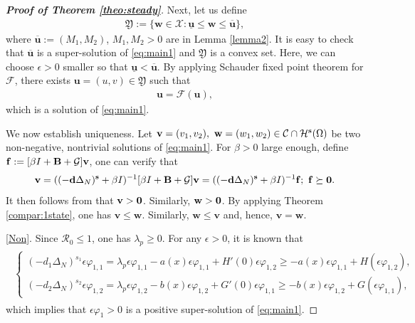\documentclass[a4paper,11pt]{amsart}
\theoremstyle{definition}
\def\O{\Omega}
\numberwithin{equation}{section}
\theoremstyle{definition}
\def\O{\Omega}
\begin{document}
\begin{proof}[\bf Proof of Theorem \ref{theo:steady}]
Next, let us define
\begin{align*}
\mathfrak{Y}:=\{\textbf{w}\in\mathcal{X}: \underline{\textbf{u}}\leq\textbf{w} \leq \overline{\textbf{u}} \},
\end{align*}
where $\overline{\textbf{u}} :=(M_1,M_2)$, $M_1,M_2>0$ are in Lemma \ref{lemma2}. It is easy to check that $\overline{\textbf{u}}$ is a super-solution of \eqref{eq:main1} and $\mathfrak{Y}$ is a convex set. Here, we can choose $\epsilon>0$ smaller so that $\underline{\textbf{u}}<\overline{\textbf{u}}$. By applying Schauder fixed point theorem for $\mathcal{F}$, there exists $\textbf{u}=(u,v)\in \mathfrak{Y}$ such that
\begin{align*}
\textbf{u}=\mathcal{F}(\textbf{u}),
\end{align*}
which is a solution of \eqref{eq:main1}. 

We now establish uniqueness. Let $\mathbf{v}=(v_1,v_2),~\mathbf{w}=(w_1,w_2) \in \mathcal{C} \cap \mathcal{H}^{\bf s}(\O)$ be two non-negative, nontrivial solutions of \eqref{eq:main1}. For $\beta>0$ large enough, define ${\bf f}:=[\beta I+ \textbf{B}+\mathcal{G}]\textbf{v}$, one can verify that
\begin{align*}
\textbf{v}=((-\textbf{d}\Delta_N)^{\textbf{s}}+\beta I)^{-1}[\beta I+ \textbf{B}+\mathcal{G}]\textbf{v}=((-\textbf{d}\Delta_N)^{\textbf{s}}+\beta I)^{-1}{\bf f};~{\bf f}\succeq {\bf 0}.
\end{align*}
It then follows from \cite[Theorem 3.1, Step 3, Case 1]{zhao_spatiotemporal_2025} that $\textbf{v}>{\bf 0}$. Similarly, $\textbf{w}>{\bf 0}$. By applying Theorem \ref{compar:1state}, one has $\mathbf{v} \leq \mathbf{w}$. Similarly, $\mathbf{w} \leq \mathbf{v}$ and, hence, $\mathbf{v} = \mathbf{w}$.


\ref{Non}. Since $\mathcal{R}_0\leq 1$, one has $\lambda_p\geq 0$.  For any $\epsilon>0$, it is known that
\begin{align*}
\begin{split}
\left\{\begin{array}{lllll}
(-d_1\Delta_N)^{s_1}\epsilon\varphi_{1,1}=\lambda_p \epsilon\varphi_{1,1}-a(x)\epsilon\varphi_{1,1}+H'(0)\epsilon\varphi_{1,2}\geq-a(x)\epsilon\varphi_{1,1}+H(\epsilon\varphi_{1,2})  , \\
(-d_2\Delta_N)^{s_2}\epsilon\varphi_{1,2}=\lambda_p \epsilon\varphi_{1,2}-b(x)\epsilon\varphi_{1,2}+G'(0)\epsilon\varphi_{1,1}\geq -b(x)\epsilon\varphi_{1,2}+G(\epsilon\varphi_{1,1}),
\end{array}\right.
\end{split}
\end{align*}
which implies that $\epsilon\varphi_1>0$ is a positive super-solution of \eqref{eq:main1}.


\end{proof}
\end{document}
